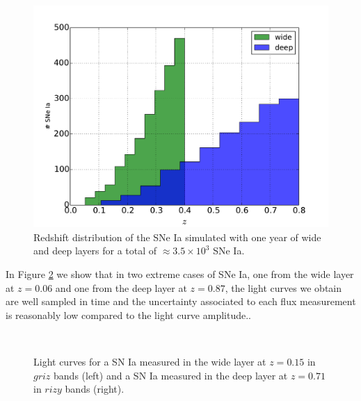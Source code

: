 \documentclass[\docopts]{\docclass}
\begin{document}
\begin{figure}[ht]
  \centering
  \includegraphics[width=\linewidth]{redshift_distribution_one_season.pdf}
  \caption{Redshift distribution of the SNe Ia simulated with one year of wide and deep layers for a total of $\approx 3.5\times10^3$ SNe Ia.}
  \label{fig:z_distrib}
\end{figure}
In Figure \ref{fig:lc_examples} we show that in two extreme cases of SNe Ia, one from the wide layer at $z=0.06$ and one from the deep layer at $z=0.87$, the light curves we obtain are well sampled in time and the uncertainty associated to each flux measurement is reasonably low compared to the light curve amplitude..

\begin{figure}[t]
\begin{center}
\\
\caption{Light curves for a SN Ia measured in the wide layer at $z=0.15$ in $griz$ bands (left) and a SN Ia measured in the deep layer at $z=0.71$ in $rizy$ bands (right).}
\label{fig:lc_examples}
\end{center}
\end{figure}
\end{document}
